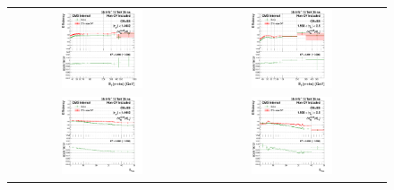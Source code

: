 \clearpage
\begin{figure}[bh]
  \begin{center}
    \begin{tabular}{cc}
      \includegraphics[width=0.45\textwidth]{figures/Zprime/2016/ScaleFactor/SameSign/N_1_eff/g_compare_cut_Et_Barrel_ea_ta_inc_AS_N_2_DetaIn_Dxy_PUW.png} &
      \includegraphics[width=0.45\textwidth]{figures/Zprime/2016/ScaleFactor/SameSign/N_1_eff/g_compare_cut_Et_Endcap_ea_ta_inc_AS_N_2_DetaIn_Dxy_PUW.png} \\
      \includegraphics[width=0.45\textwidth]{figures/Zprime/2016/ScaleFactor/SameSign/N_1_eff/g_compare_cut_nVtx_Barrel_ea_ta_inc_AS_N_2_DetaIn_Dxy_PUW.png} &
      \includegraphics[width=0.45\textwidth]{figures/Zprime/2016/ScaleFactor/SameSign/N_1_eff/g_compare_cut_nVtx_Endcap_ea_ta_inc_AS_N_2_DetaIn_Dxy_PUW.png} \\

\end{tabular}
\end{center}
\end{figure}
